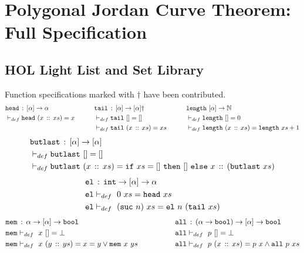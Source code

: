 \chapter{Polygonal Jordan Curve Theorem: Full Specification}
\label{app:JordanVerification}

\section{HOL Light List and Set Library}
Function specifications marked with $\dag$ have been contributed.
\begin{alignat*}{3}
  & \texttt{head}\,:\,[\alpha] \rightarrow \alpha &\qquad
  & \texttt{tail}\,:\,[\alpha] \rightarrow [\alpha]\dag &\qquad
  & \texttt{length}\ [\alpha]\rightarrow \mathbb{N}\\
  & \vdash_{def}\texttt{head}\ (x\,::\,xs) = x &\qquad
  & \vdash_{def}\texttt{tail}\ [] = [] &\qquad
  & \vdash_{def}\texttt{length}\ [] = 0\\
  & &\qquad
  &\vdash_{def}\texttt{tail}\ (x\,::\,xs) = xs &\qquad
  & \vdash_{def}\texttt{length}\ (x\,::\,xs) = \texttt{length}\ xs + 1
\end{alignat*}
\begin{align*}
  &\code{butlast}\,:\,[\alpha] \rightarrow [\alpha]\\
  &\vdash_{def}\code{butlast}\ [] = []\\
  &\vdash_{def}\code{butlast}\ (\cons{x}{xs}) = \code{if}\ xs=[]\ \code{then}\ []\ \code{else}\ \cons{x}{(\code{butlast}\ xs)}
\end{align*}
\begin{align*}
  &\code{el}\,:\,\code{int} \rightarrow [\alpha] \rightarrow \alpha\\
  &\code{el}\vdash_{def}\ 0\ xs = \code{head}\ xs\\
  &\code{el}\vdash_{def}\ (\code{suc}\ n)\ xs = \code{el}\ n\ (\code{tail}\ xs)
\end{align*}
\begin{align*}
  & \texttt{mem}\,:\,\alpha \rightarrow [\alpha] \rightarrow \texttt{bool} &\qquad\qquad
  & \texttt{all}\,:\,(\alpha\rightarrow\texttt{bool}) \rightarrow [\alpha] \rightarrow \texttt{bool}\\
  & \texttt{mem}\vdash_{def}\ x\ [] = \bot &\qquad\qquad
  & \texttt{all}\vdash_{def}\ p\ [] = \bot\\
  & \texttt{mem}\vdash_{def}\ x\ (y\,::\,ys) = x = y \vee \texttt{mem}\ x\ ys &\qquad\qquad
  & \texttt{all}\vdash_{def}\ p\ (x\,::\,xs) = p\ x \wedge \texttt{all}\ p\ xs   
\end{align*}
